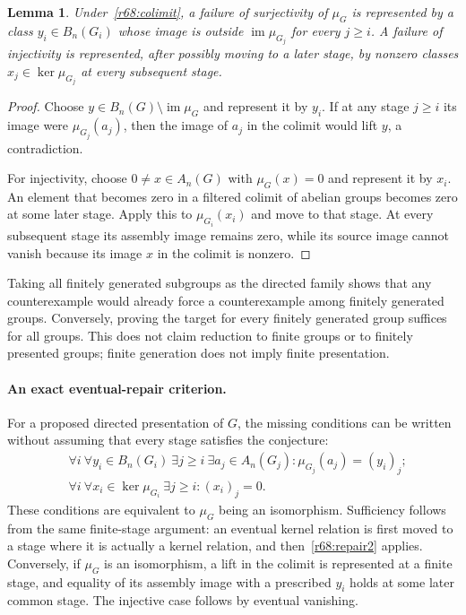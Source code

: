 \documentclass[11pt,a4paper]{article}
\newtheorem{notebooklemma}{Lemma}[section]
\numberwithin{equation}{section}
\begin{document}
\begin{notebooklemma}\label{r68:persist}
Under~\eqref{r68:colimit}, a failure of surjectivity of $\mu_G$ is represented by a class $y_i\in B_n(G_i)$ whose image is outside $\operatorname{im}\mu_{G_j}$ for every $j\ge i$. A failure of injectivity is represented, after possibly moving to a later stage, by nonzero classes $x_j\in\ker\mu_{G_j}$ at every subsequent stage.
\end{notebooklemma}
\begin{proof}
Choose $y\in B_n(G)\setminus\operatorname{im}\mu_G$ and represent it by $y_i$. If at any stage $j\ge i$ its image were $\mu_{G_j}(a_j)$, then the image of $a_j$ in the colimit would lift $y$, a contradiction.

For injectivity, choose $0\ne x\in A_n(G)$ with $\mu_G(x)=0$ and represent it by $x_i$. An element that becomes zero in a filtered colimit of abelian groups becomes zero at some later stage. Apply this to $\mu_{G_i}(x_i)$ and move to that stage. At every subsequent stage its assembly image remains zero, while its source image cannot vanish because its image $x$ in the colimit is nonzero.
\end{proof}

Taking all finitely generated subgroups as the directed family shows that any counterexample would already force a counterexample among finitely generated groups. Conversely, proving the target for every finitely generated group suffices for all groups. This does not claim reduction to finite groups or to finitely presented groups; finite generation does not imply finite presentation.

\paragraph{An exact eventual-repair criterion.}
For a proposed directed presentation of $G$, the missing conditions can be written without assuming that every stage satisfies the conjecture:
\begin{align}
 &\forall i\ \forall y_i\in B_n(G_i)\ \exists j\ge i\ \exists a_j\in A_n(G_j):
       \mu_{G_j}(a_j)=(y_i)_j; \label{r68:repair1}\\
 &\forall i\ \forall x_i\in\ker\mu_{G_i}\ \exists j\ge i:
       (x_i)_j=0. \label{r68:repair2}
\end{align}
These conditions are equivalent to $\mu_G$ being an isomorphism. Sufficiency follows from the same finite-stage argument: an eventual kernel relation is first moved to a stage where it is actually a kernel relation, and then~\eqref{r68:repair2} applies. Conversely, if $\mu_G$ is an isomorphism, a lift in the colimit is represented at a finite stage, and equality of its assembly image with a prescribed $y_i$ holds at some later common stage. The injective case follows by eventual vanishing.
\end{document}
